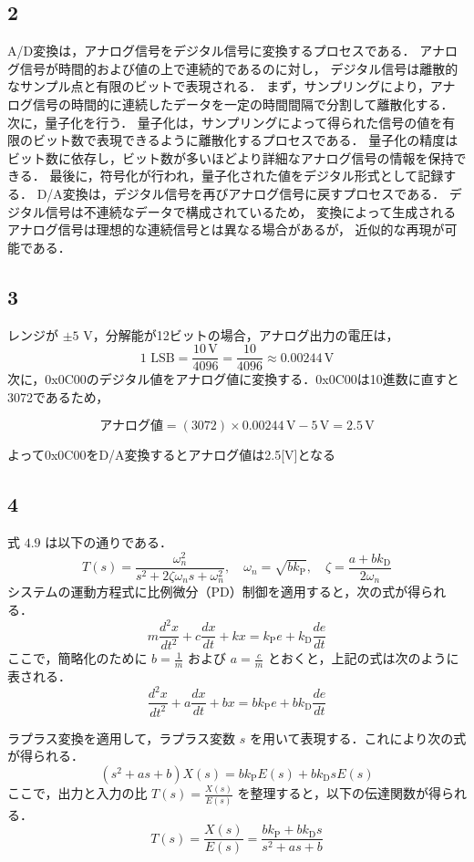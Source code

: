 \subsection*{2}
A/D変換は，アナログ信号をデジタル信号に変換するプロセスである．
アナログ信号が時間的および値の上で連続的であるのに対し，
デジタル信号は離散的なサンプル点と有限のビットで表現される．
まず，サンプリングにより，アナログ信号の時間的に連続したデータを一定の時間間隔で分割して離散化する．
次に，量子化を行う．
量子化は，サンプリングによって得られた信号の値を有限のビット数で表現できるように離散化するプロセスである．
量子化の精度はビット数に依存し，ビット数が多いほどより詳細なアナログ信号の情報を保持できる．
最後に，符号化が行われ，量子化された値をデジタル形式として記録する．
D/A変換は，デジタル信号を再びアナログ信号に戻すプロセスである．
デジタル信号は不連続なデータで構成されているため，
変換によって生成されるアナログ信号は理想的な連続信号とは異なる場合があるが，
近似的な再現が可能である．


\subsection*{3}
レンジが \(\pm 5\) V，分解能が12ビットの場合，アナログ出力の電圧は，
\[
  \text{1 LSB} = \frac{10 \, \text{V}}{4096} = \frac{10}{4096} \approx 0.00244 \, \text{V}
\]
次に，0x0C00のデジタル値をアナログ値に変換する．0x0C00は10進数に直すと3072であるため，

\[
  \text{アナログ値} = (3072) \times 0.00244 \, \text{V} - 5 \, \text{V} = 2.5 \, \text{V}
\]

よって0x0C00をD/A変換するとアナログ値は2.5[V]となる

\subsection*{4}
式 \(4.9\) は以下の通りである．
\[
  T(s) = \frac{\omega_n^2}{s^2 + 2 \zeta \omega_n s + \omega_n^2}, \quad \omega_n = \sqrt{b k_{\mathrm{P}}}, \quad \zeta = \frac{a + b k_{\mathrm{D}}}{2 \omega_n}
\]
システムの運動方程式に比例微分（PD）制御を適用すると，次の式が得られる．
\[
  m \frac{d^2 x}{dt^2} + c \frac{dx}{dt} + kx = k_{\mathrm{P}} e + k_{\mathrm{D}} \frac{de}{dt}
\]
ここで，簡略化のために \( b = \frac{1}{m} \) および \( a = \frac{c}{m} \) とおくと，上記の式は次のように表される．
\[
  \frac{d^2 x}{dt^2} + a \frac{dx}{dt} + bx = b k_{\mathrm{P}} e + b k_{\mathrm{D}} \frac{de}{dt}
\]

ラプラス変換を適用して，ラプラス変数 \( s \) を用いて表現する．これにより次の式が得られる．
\[
  (s^2 + as + b) X(s) = b k_{\mathrm{P}} E(s) + b k_{\mathrm{D}} s E(s)
\]
ここで，出力と入力の比 \( T(s) = \frac{X(s)}{E(s)} \) を整理すると，以下の伝達関数が得られる．
\[
  T(s) = \frac{X(s)}{E(s)} = \frac{b k_{\mathrm{P}} + b k_{\mathrm{D}} s}{s^2 + as + b}
\]

